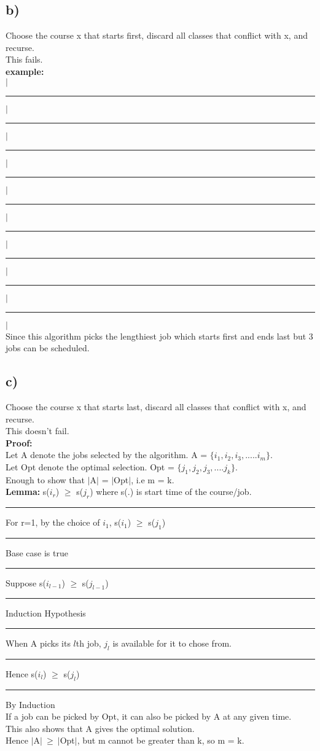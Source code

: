 \documentclass{report}
\begin{document}
 \subsection*{b)}
 Choose the course x that starts first, discard all classes that conflict with x, and recurse.\\
 This fails. \\
 \textbf{example:} \\
  $|$\noindent\rule[0.5mm]{8cm}{0.4pt}$|$\\
  \noindent\rule[0.5mm]{2cm}{0pt}$|$\noindent\rule[0.5mm]{2cm}{0.4pt}$|$\noindent\rule[0.5mm]{1cm}{0pt}$|$\noindent\rule[0.5mm]{2cm}{0.4pt}$|$\\
  \noindent\rule[0.5mm]{0.5cm}{0pt}$|$\noindent\rule[0.5mm]{3cm}{0.4pt}$|$\noindent\rule[0.5mm]{3.75cm}{0pt}$|$\noindent\rule[0.5mm]{0.5cm}{0.4pt}$|$\\
  Since this algorithm picks the lengthiest job which starts first and ends last but 3 jobs can be scheduled.
 \subsection*{c)}
  Choose the course x that starts last, discard all classes that conflict with x, and recurse.\\
  This doesn't fail.\\
  \textbf{Proof:}\\
  Let A denote the jobs selected by the algorithm. A = $\{i_1,i_2,i_3,.....i_m\}$.\\
  Let Opt denote the optimal selection. Opt = $\{j_1,j_2,j_3,....j_k\}$.\\
  Enough to show that $|$A$|$ = $|$Opt$|$, i.e m = k.\\
  \textbf{Lemma:} s($i_r$) $\geq$ s($j_r$) where s(.) is start time of the course/job.\\
  \noindent\rule[0.5mm]{1.25cm}{0pt}For r=1, by the choice of $i_1$, s($i_1$) $\geq$ s($j_1$)\noindent\rule[0.5mm]{2cm}{0pt}  Base case is true\\
  \noindent\rule[0.5mm]{1.25cm}{0pt}Suppose s($i_{l-1}$) $\geq$ s($j_{l-1}$)\noindent\rule[0.5mm]{4.5cm}{0pt}Induction Hypothesis\\
  \noindent\rule[0.5mm]{1.25cm}{0pt}When A picks its $l$th job, $j_l$ is available for it to chose from.\\
  \noindent\rule[0.5mm]{1.25cm}{0pt}Hence s($i_l$) $\geq$ s($j_l$)\noindent\rule[0.5mm]{5.55cm}{0pt}By Induction\\
  If a job can be picked by Opt, it can also be picked by A at any given time.\\
  This also shows that A gives the optimal solution.\\
  Hence $|$A$|\ \geq\ |$Opt$|$, but m cannot be greater than k, so m = k.
\end{document}
